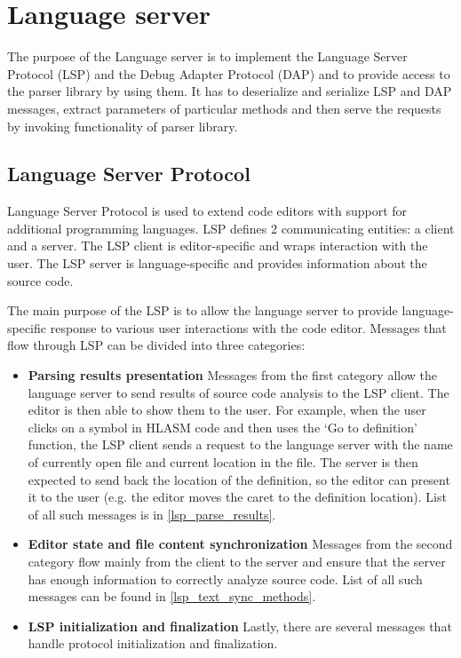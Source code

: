 \chapter{Language server}

The purpose of the Language server is to implement the Language Server Protocol (LSP) and the Debug Adapter Protocol (DAP) and to provide access to the parser library by using them. It has to deserialize and serialize LSP and DAP messages, extract parameters of particular methods and then serve the requests by invoking functionality of parser library.

\section{Language Server Protocol}
Language Server Protocol is used to extend code editors with support for additional programming languages. LSP defines 2 communicating entities: a client and a server. The LSP client is editor-specific and wraps interaction with the user. The LSP server is language-specific and provides information about the source code.

The main purpose of the LSP is to allow the language server to provide language-specific response to various user interactions with the code editor. Messages that flow through LSP can be divided into three categories:

\begin{itemize}
	\item \textbf{Parsing results presentation} Messages from the first category allow the language server to send results of source code analysis to the LSP client. The editor is then able to show them to the user. For example, when the user clicks on a symbol in HLASM code and then uses the `Go to definition' function, the LSP client sends a request to the language server with the name of currently open file and current location in the file. The server is then expected to send back the location of the definition, so the editor can present it to the user (e.g. the editor moves the caret to the definition location). List of all such messages is in \cref{lsp_parse_results}.

	\item \textbf{Editor state and file content synchronization} Messages from the second category flow mainly from the client to the server and ensure that the server has enough information to correctly analyze source code. List of all such messages can be found in \cref{lsp_text_sync_methods}.
	
	\item \textbf{LSP initialization and finalization} Lastly, there are several messages that handle protocol initialization and finalization.
\end{itemize}


